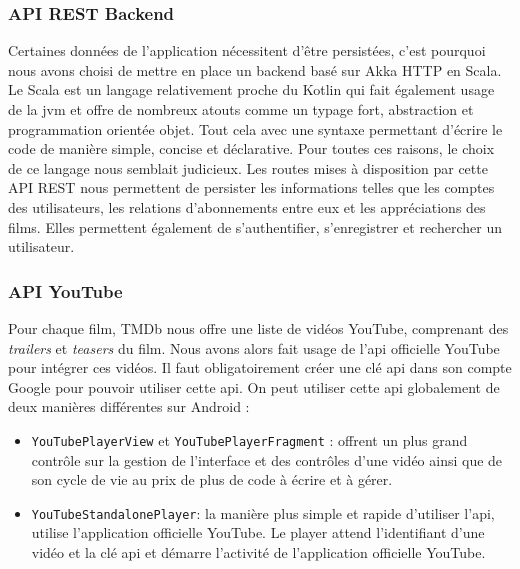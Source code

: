 \subsubsection{API REST Backend}
Certaines données de l'application nécessitent d'être persistées, c'est pourquoi nous avons choisi de mettre en place un backend basé sur Akka HTTP \cite{akka} en Scala. Le Scala est un langage relativement proche du Kotlin qui fait également usage de la \acrshort{jvm} et offre de nombreux atouts comme un typage fort, abstraction et programmation orientée objet. Tout cela avec une syntaxe permettant d'écrire le code de manière simple, concise et déclarative. Pour toutes ces raisons, le choix de ce langage nous semblait judicieux. Les routes mises à disposition par cette API REST nous permettent de persister les informations telles que les comptes des utilisateurs, les relations d'abonnements entre eux et les appréciations des films. Elles permettent également de s'authentifier, s'enregistrer et rechercher un utilisateur.

\subsubsection{API YouTube}
Pour chaque film, TMDb nous offre une liste de vidéos YouTube, comprenant des \textit{trailers} et \textit{teasers} du film. Nous avons alors fait usage de l'\acrshort{api} officielle YouTube \cite{youtube} pour intégrer ces vidéos. Il faut obligatoirement créer une clé \acrshort{api} dans son compte Google pour pouvoir utiliser cette \acrshort{api}. On peut utiliser cette \acrshort{api} globalement de deux manières différentes sur Android :
\begin{itemize}
    \item \texttt{YouTubePlayerView} et \texttt{YouTubePlayerFragment} : offrent un plus grand contrôle sur la gestion de l'interface et des contrôles d'une vidéo ainsi que de son cycle de vie au prix de plus de code à écrire et à gérer.
    \item \texttt{YouTubeStandalonePlayer}: la manière plus simple et rapide d'utiliser l'\acrshort{api}, utilise l'application officielle YouTube. Le player attend l'identifiant d'une vidéo et la clé \acrshort{api} et démarre l'activité de l'application officielle YouTube.
\end{itemize}

